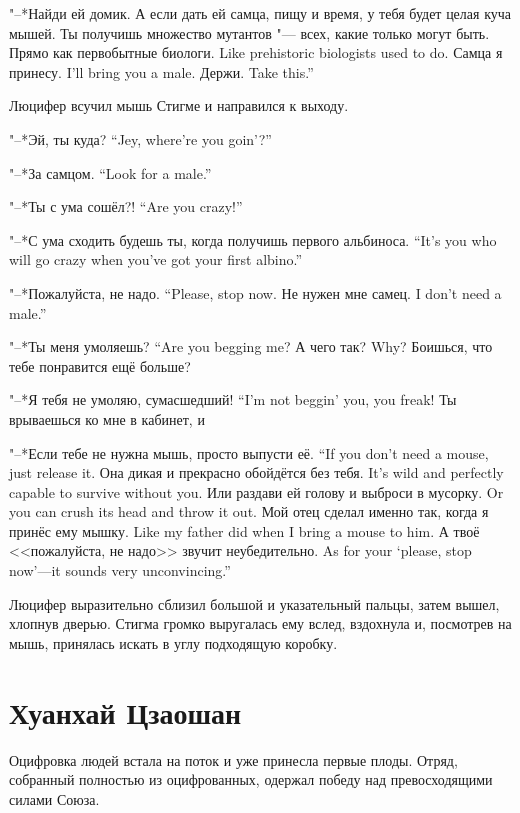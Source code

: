 "--*Найди ей домик.
А если дать ей самца, пищу и время, у тебя будет целая куча мышей.
Ты получишь множество мутантов "--- всех, какие только могут быть.
{Прямо как первобытные биологи.}
{Like prehistoric biologists used to do.}
{Самца я принесу.}
{I'll bring you a male.}
{Держи.}
{Take this.''}

Люцифер всучил мышь Стигме и направился к выходу.

{"--*Эй, ты куда?}
{``Jey, where're you goin'?''}

{"--*За самцом.}
{``Look for a male.''}

{"--*Ты с ума сошёл?!}
{``Are you crazy!''}

{"--*С ума сходить будешь ты, когда получишь первого альбиноса.}
{``It's you who will go crazy when you've got your first albino.''}

{"--*Пожалуйста, не надо.}
{``Please, stop now.}
{Не нужен мне самец.}
{I don't need a male.''}

{"--*Ты меня умоляешь?}
{``Are you begging me?}
{А чего так?}
{Why?}
Боишься, что тебе понравится ещё больше?

{"--*Я тебя не умоляю, сумасшедший!}
{``I'm not beggin' you, you freak!}
Ты врываешься ко мне в кабинет, и\ldotst

{"--*Если тебе не нужна мышь, просто выпусти её.}
{``If you don't need a mouse, just release it.}
{Она дикая и прекрасно обойдётся без тебя.}
{It's wild and perfectly capable to survive without you.}
{Или раздави ей голову и выброси в мусорку.}
{Or you can crush its head and throw it out.}
{Мой отец сделал именно так, когда я принёс ему мышку.}
{Like my father did when I bring a mouse to him.}
{А твоё <<пожалуйста, не надо>> звучит неубедительно.}
{As for your `please, stop now'---it sounds very unconvincing.''}

Люцифер выразительно сблизил большой и указательный пальцы, затем вышел, хлопнув дверью.
Стигма громко выругалась ему вслед, вздохнула и, посмотрев на мышь, принялась искать в углу подходящую коробку.

\section{Хуанхай Цзаошан}

Оцифровка людей встала на поток и уже принесла первые плоды.
Отряд, собранный полностью из оцифрованных, одержал победу над превосходящими силами Союза.

